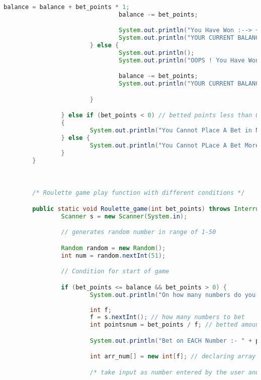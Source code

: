 \documentclass[]{article}
\begin{document}
\begin{lstlisting}[language=Java]
                                balance = balance + bet_points * 1;
                                balance -= bet_points;

                                System.out.println("You Have Won :--> +" + bet_points * 1);
                                System.out.println("YOUR CURRENT BALANCE --> " + balance);
                        } else {
                                System.out.println();
                                System.out.println("OOPS ! You Have Won Nothing !!");

                                balance -= bet_points;
                                System.out.println("YOUR CURRENT BALANCE --> " + balance);

                        }

                } else if (bet_points < 0) // betted points less than 0
                {
                        System.out.println("You Cannot Place A Bet in Negative");
                } else {
                        System.out.println("You Cannot PLace A Bet More Than Your Current Balance ");
                }
        }



        /* Roulette game play function with different conditions */

        public static void Roulette_game(int bet_points) throws InterruptedException {
                Scanner s = new Scanner(System.in);

                // generates random number in range of 1-50

                Random random = new Random();
                int num = random.nextInt(51);

                // Condition for start of game

                if (bet_points <= balance && bet_points > 0) {
                        System.out.println("On how many numbers do you want place your bet [1 - 50]");
                        
                        int f;
                        f = s.nextInt(); // how many numbers to bet
                        int pointsnum = bet_points / f; // betted amount on each number

                        System.out.println("Bet on EACH Number :- " + pointsnum);

                        int arr_num[] = new int[f]; // declaring array of size betted number

                        /* take input as number entered by the user and store it in array */


\end{lstlisting}
\end{document}
